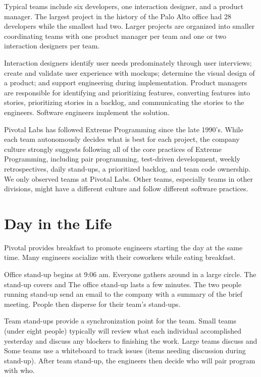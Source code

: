 Typical teams include six developers, one interaction designer, and a product manager. The largest project in the history of the Palo Alto office had 28 developers while the smallest had two. Larger projects are organized into smaller coordinating teams with one product manager per team and one or two interaction designers per team.


Interaction designers identify user needs predominately through user interviews; create and validate user experience with mockups; determine the visual design of a product; and support engineering during implementation. Product managers are responsible for identifying and prioritizing features, converting features into stories, prioritizing stories in a backlog, and communicating the stories to the engineers. Software engineers implement the solution. 


Pivotal Labs has followed Extreme Programming \cite{BeckExtremeProgramming2004} since the late 1990's. While each team autonomously decides what is best for each project, the company culture strongly suggests following all of the core practices of Extreme Programming, including pair programming, test-driven development, weekly retrospectives, daily stand-ups, a prioritized backlog, and team code ownership. We only observed teams at Pivotal Labs. Other teams, especially teams in other divisions, might have a different culture and follow different software practices.


\section{Day in the Life}
Pivotal provides breakfast to promote engineers starting the day at the same time. Many engineers socialize with their coworkers while eating breakfast. 


Office stand-up begins at 9:06 am. Everyone gathers around in a large circle. The stand-up covers    and  The office stand-up lasts a few minutes. The two people running stand-up send an email to the company with a summary of the brief meeting. People then disperse for their team's stand-ups.


Team stand-ups provide a synchronization point for the team. Small teams (under eight people) typically will review what each individual accomplished yesterday and discuss any blockers to finishing the work. Large teams discuss  and  Some teams use a whiteboard to track  issues (items needing discussion during stand-up). After team stand-up, the engineers then decide  who will pair program with who. 


